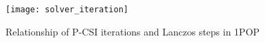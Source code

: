 \begin {figure}[!t]
\centering
\vspace{-10pt}
\texttt{[image: solver\_iteration]}
\caption []{Relationship of P-CSI iterations and Lanczos steps in 1\degree POP \label {fig:iter}}
\end {figure}


